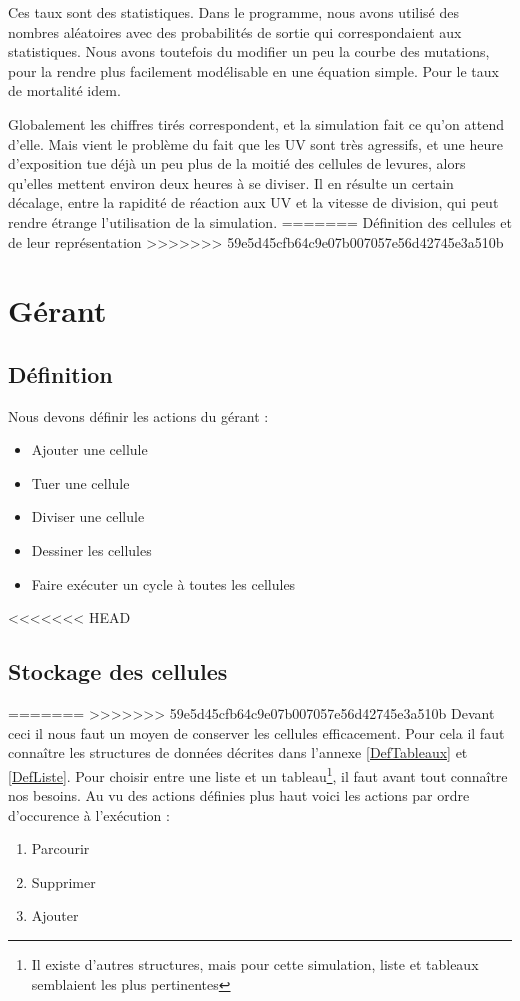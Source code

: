   Ces taux sont des statistiques. Dans le programme, nous avons utilisé des nombres aléatoires avec des probabilités de sortie qui correspondaient aux statistiques. Nous avons toutefois du modifier un peu la courbe des mutations, pour la rendre plus facilement modélisable en une équation simple. Pour le taux de mortalité idem.
  
  Globalement les chiffres tirés correspondent, et la simulation fait ce qu'on attend d'elle. Mais vient le problème du fait que les UV sont très agressifs, et une heure d'exposition tue déjà un peu plus de la moitié des cellules de levures, alors qu'elles mettent environ deux heures à se diviser. Il en résulte un certain décalage, entre la rapidité de réaction aux UV et la vitesse de division, qui peut rendre étrange l'utilisation de la simulation.
=======
Définition des cellules et de leur représentation
>>>>>>> 59e5d45cfb64c9e07b007057e56d42745e3a510b

\section{Gérant}
\subsection{Définition}
Nous devons définir les actions du gérant : 
\begin{itemize}
	\item Ajouter une cellule
	\item Tuer une cellule
	\item Diviser une cellule
	\item Dessiner les cellules
	\item Faire exécuter un cycle à toutes les cellules
\end{itemize}

<<<<<<< HEAD
\subsection{Stockage des cellules}
=======
>>>>>>> 59e5d45cfb64c9e07b007057e56d42745e3a510b
Devant ceci il nous faut un moyen de conserver les cellules efficacement.
Pour cela il faut connaître les structures de données décrites dans l'annexe \ref{DefTableaux} et \ref{DefListe}. Pour choisir entre une liste et un tableau\footnote{Il existe d'autres structures, mais pour cette simulation, liste et tableaux semblaient les plus pertinentes}, il faut avant tout connaître nos besoins. Au vu des actions définies plus haut voici les actions par ordre d'occurence à l'exécution : 
\begin{enumerate}
	\item Parcourir 
	\item Supprimer
	\item Ajouter
\end{enumerate}

